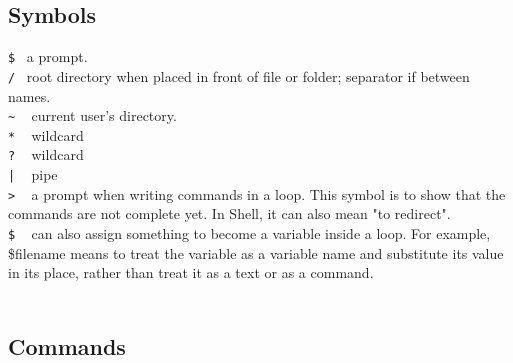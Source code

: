\documentclass{article}
\begin{document}
\subsection{Symbols}
\texttt{\$}~
a prompt.\\
\texttt{/}~	root directory when placed in front of file or folder; separator if between names.\\
\texttt{\~{}} ~	current user's directory.\\
\texttt{*} ~ wildcard\\
\texttt{?} ~	 wildcard\\
\texttt{|} ~	 pipe\\
\texttt{>} ~ a prompt when writing commands in a loop. This symbol is to show that the commands are not complete yet.  In Shell, it can also mean "to redirect". \\ 
\texttt{\$} ~ can also assign something to become a variable inside a loop. For example, \$filename means to treat the variable as a variable name and substitute its value in its place, rather than treat it as a text or as a command.\\
\\
\subsection{Commands}
\end{document}
